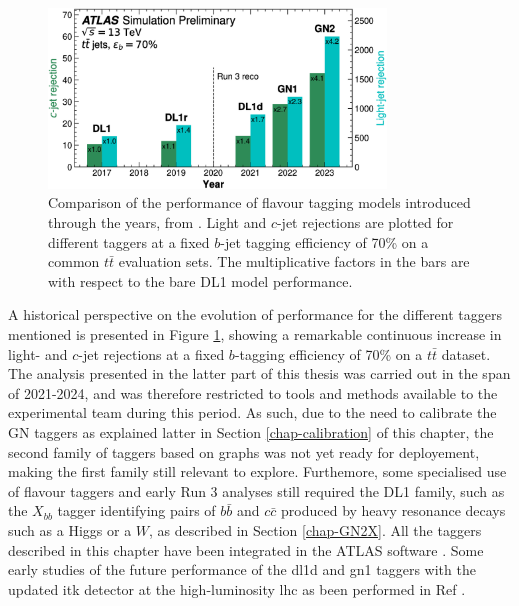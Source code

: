 \begin{figure}[h!]
  \center
  \includegraphics[width=0.8\textwidth]{Images/FTAG/storyFtag.png}
  \caption{Comparison of the performance of flavour tagging models introduced through the years, from \cite{ATL-PLOT-FTAG-2023-01}. Light and $c$-jet rejections are plotted for different taggers at a fixed $b$-jet tagging efficiency of 70\% on a common $t\bar{t}$ evaluation sets. The multiplicative factors in the bars are with respect to the bare DL1 model performance.} 
  \label{fig:storyFtag}
\end{figure}

A historical perspective on the evolution of performance for the different taggers mentioned is presented in Figure \ref{fig:storyFtag}, showing a remarkable continuous increase in light- and $c$-jet rejections at a fixed $b$-tagging efficiency of 70\% on a $t\bar{t}$ dataset. The analysis presented in the latter part of this thesis was carried out in the span of 2021-2024, and was therefore restricted to tools and methods available to the experimental team during this period. As such, due to the need to calibrate the GN taggers as explained latter in Section \ref{chap-calibration} of this chapter, the second family of taggers based on graphs was not yet ready for deployement, making the first family still relevant to explore. Furthemore, some specialised use of flavour taggers and early Run 3 analyses still required the DL1 family, such as the $X_{bb}$ tagger identifying pairs of $b\bar{b}$ and $c\bar{c}$ produced by heavy resonance decays such as a Higgs or a $W$, as described in Section \ref{chap-GN2X}. All the taggers described in this chapter have been integrated in the ATLAS software \cite{ATL-SOFT-PUB-2021-001}. Some early studies of the future performance of the \gls{dl1d} and \gls{gn1} taggers with the updated \gls{itk} detector at the high-luminosity \gls{lhc} as been performed in Ref \cite{ATL-PHYS-PUB-2022-047}.


